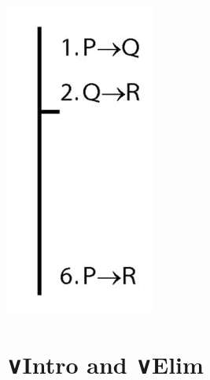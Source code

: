 \documentclass[12pt]{extarticle}
\begin{document}
\begin{multicols*}{3}
\begin{center}
\includegraphics[scale=0.3]{img/proof_arrow_intro.png}
\end{center}
 
 
\section{∨Intro and ∨Elim}
 

\end{multicols*}
\end{document}
